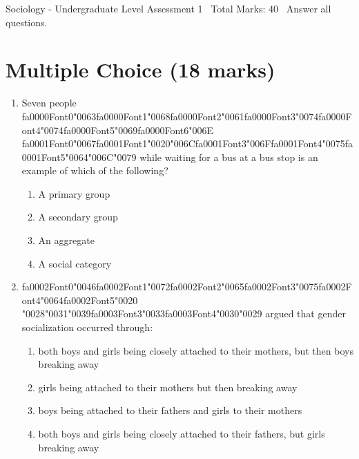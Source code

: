 \documentclass[12pt]{article}
\begin{document}
\begin{center}
Sociology - Undergraduate Level Assessment 1 \
Total Marks: 40 \
Answer all questions.
\end{center}

\section*{Multiple Choice (18 marks)}
\begin{enumerate}[label=\arabic*.]
\item Seven people {\csname fa0000Font0\endcsname\char"0063}{\csname fa0000Font1\endcsname\char"0068}{\csname fa0000Font2\endcsname\char"0061}{\csname fa0000Font3\endcsname\char"0074}{\csname fa0000Font4\endcsname\char"0074}{\csname fa0000Font5\endcsname\char"0069}{\csname fa0000Font6\endcsname\char"006E} {\csname fa0001Font0\endcsname\char"0067}{\csname fa0001Font1\endcsname\char"0020}{\char"006C}{\csname fa0001Font3\endcsname\char"006F}{\csname fa0001Font4\endcsname\char"0075}{\csname fa0001Font5\endcsname\char"0064}{\char"006C}{\char"0079} while waiting for a bus at a bus stop is an example of which of the following?
\begin{enumerate}[label=(\alph*)]
    \item A primary group
    \item A secondary group
    \item An aggregate
    \item A social category
\end{enumerate}
\item {\csname fa0002Font0\endcsname\char"0046}{\csname fa0002Font1\endcsname\char"0072}{\csname fa0002Font2\endcsname\char"0065}{\csname fa0002Font3\endcsname\char"0075}{\csname fa0002Font4\endcsname\char"0064}{\csname fa0002Font5\endcsname\char"0020} {\char"0028}{\char"0031}{\char"0039}{\csname fa0003Font3\endcsname\char"0033}{\csname fa0003Font4\endcsname\char"0030}{\char"0029} argued that gender socialization occurred through:
\begin{enumerate}[label=(\alph*)]
    \item both boys and girls being closely attached to their mothers, but then boys breaking away
    \item girls being attached to their mothers but then breaking away
    \item boys being attached to their fathers and girls to their mothers
    \item both boys and girls being closely attached to their fathers, but girls breaking away

\end{enumerate}
\end{enumerate}
\end{document}
